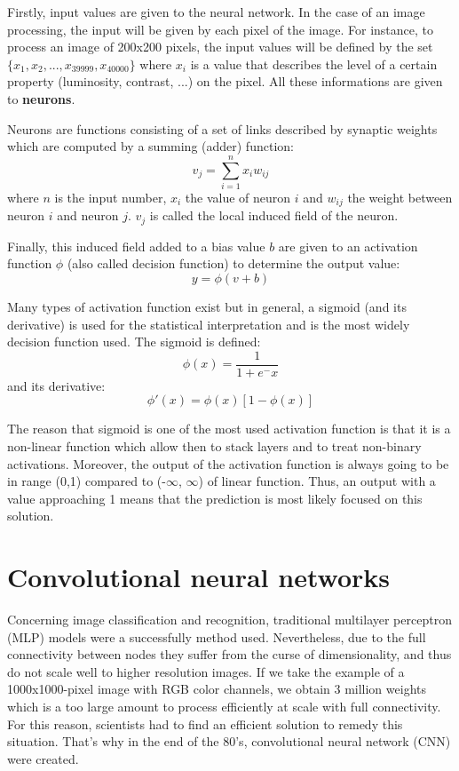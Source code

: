 \documentclass[11pt, openany]{report}
\theoremstyle{plain}
\theoremstyle{definition}
\theoremstyle{remark}
\begin{document}
\newpage
Firstly, input values are given to the neural network. In the case of an image processing, the input will be given by each pixel of the image. For instance, to process an image of 200x200 pixels, the input values will be defined by the set $\{x_{1}, x_{2}, ... , x_{39999}, x_{40000}\}$ where $x_{i}$ is a value that describes the level of a certain property (luminosity, contrast, ...) on the pixel. All these informations are given to \textbf{neurons}.

Neurons are functions consisting of a set of links described by synaptic weights which are computed by a summing (adder) function: 
$$ v_{j} = \sum_{i=1}^{n} x_{i} w_{ij} $$ where $n$ is the input number, $x_{i}$ the value of neuron $i$ and $w_{ij}$ the weight between neuron $i$ and neuron $j$. $v_{j}$ is called the local induced field of the neuron. 

Finally, this induced field added to a bias value $b$ are given to an activation function  $\phi$ (also called decision function) to determine the output value: 
$$ y = \phi(v + b)$$

Many types of activation function exist but in general, a sigmoid (and its derivative) is used for the statistical interpretation and is the most widely decision function used. The sigmoid is defined: 
$$ \phi(x) = \frac{1}{1+e^-x} $$ 
and its derivative:
$$ \phi'(x) = \phi(x)[1-\phi(x)] $$ 

The reason that sigmoid is one of the most used activation function is that it is a non-linear function which allow then to stack layers and to treat non-binary activations. Moreover, the output of the activation function is always going to be in range (0,1) compared to (-$\infty$, $\infty$) of linear function. Thus, an output with a value approaching 1 means that the prediction is most likely focused on this solution. 

\section{Convolutional neural networks} \label{sec:CNN}
Concerning image classification and recognition, traditional multilayer perceptron (MLP) models were a successfully method used. Nevertheless, due to the full connectivity between nodes they suffer from the curse of dimensionality, and thus do not scale well to higher resolution images. If we take the example of a 1000x1000-pixel image with RGB color channels, we obtain 3 million weights which is a too large amount to process efficiently at scale with full connectivity. For this reason, scientists had to find an efficient solution to remedy this situation. That's why in the end of the 80's, convolutional neural network (CNN) were created. 
\end{document}
